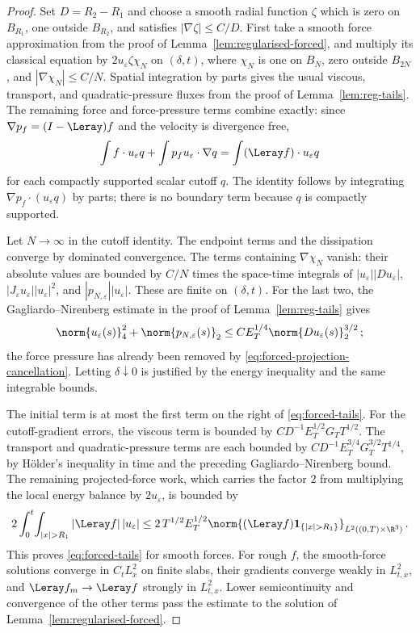 \documentclass[11pt,reqno]{amsart}
\begin{document}
\begin{proof}
Set $D=R_2-R_1$ and choose a smooth radial function $\zeta$ which is zero
on $B_{R_1}$, one outside $B_{R_2}$, and satisfies
$|\nabla\zeta|\le C/D$. First take a smooth force approximation from the
proof of Lemma~\ref{lem:regularised-forced}, and multiply its classical
equation by $2u_\varepsilon\zeta\chi_N$ on $(\delta,t)$, where $\chi_N$
is one on $B_N$, zero outside $B_{2N}$, and
$|\nabla\chi_N|\le C/N$. Spatial integration by parts gives the usual
viscous, transport, and quadratic-pressure fluxes from the proof of
Lemma~\ref{lem:reg-tails}. The remaining force and force-pressure terms
combine exactly: since $\nabla p_f=(I-\Leray)f$ and the velocity is
divergence free,
\begin{equation}\label{eq:forced-projection-cancellation}
 \int f\cdot u_\varepsilon q+\int p_f u_\varepsilon\cdot\nabla q
   =\int (\Leray f)\cdot u_\varepsilon q
\end{equation}
for each compactly supported scalar cutoff $q$. The identity follows by
integrating $\nabla p_f\cdot(u_\varepsilon q)$ by parts; there is no
boundary term because $q$ is compactly supported.

Let $N\to\infty$ in the cutoff identity. The endpoint terms and the
dissipation converge by dominated convergence. The terms containing
$\nabla\chi_N$ vanish: their absolute values are bounded by $C/N$ times
the space-time integrals of $|u_\varepsilon||Du_\varepsilon|$,
$|J_\varepsilon u_\varepsilon||u_\varepsilon|^2$, and
$|p_{N,\varepsilon}||u_\varepsilon|$. These are finite on $(\delta,t)$.
For the last two, the Gagliardo--Nirenberg estimate in the proof of
Lemma~\ref{lem:reg-tails} gives
\[
 \norm{u_\varepsilon(s)}_4^2
 +\norm{p_{N,\varepsilon}(s)}_2
 \le C E_T^{1/4}\norm{Du_\varepsilon(s)}_2^{3/2}\,;
\]
the force pressure has already been removed by
\eqref{eq:forced-projection-cancellation}. Letting $\delta\downarrow0$
is justified by the energy inequality and the same integrable bounds.

The initial term is at most the first term on the right of
\eqref{eq:forced-tails}. For the cutoff-gradient errors, the viscous term
is bounded by
$C D^{-1}E_T^{1/2}G_TT^{1/2}$. The transport and quadratic-pressure terms
are each bounded by
$C D^{-1}E_T^{3/4}G_T^{3/2}T^{1/4}$, by H\"older's inequality in time
and the preceding Gagliardo--Nirenberg bound. The remaining projected-force
work, which carries the factor $2$ from multiplying the local energy
balance by $2u_\varepsilon$, is bounded by
\[
 2\int_0^t\!\int_{|x|>R_1}|\Leray f|\,|u_\varepsilon|
 \le 2\,T^{1/2}E_T^{1/2}
       \norm{(\Leray f)\mathbf 1_{\{|x|>R_1\}}}_{L^2((0,T)\times\R^3)}\,.
\]
This proves \eqref{eq:forced-tails} for smooth forces. For rough $f$, the
smooth-force solutions converge in $C_tL^2_x$ on finite slabs, their
gradients converge weakly in $L^2_{t,x}$, and $\Leray f_m\to\Leray f$
strongly in $L^2_{t,x}$. Lower semicontinuity and convergence of the other
terms pass the estimate to the solution of Lemma~\ref{lem:regularised-forced}.


\end{proof}
\end{document}
